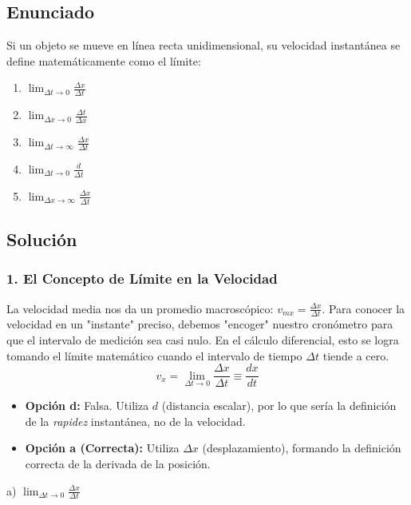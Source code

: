 \documentclass[12pt, a4paper]{article}
\begin{document}
\newpage

\subsection*{Enunciado}
Si un objeto se mueve en línea recta unidimensional, su velocidad instantánea se define matemáticamente como el límite:
\begin{enumerate}[label=\alph*)]
    \item $\lim_{\Delta t \to 0} \frac{\Delta x}{\Delta t}$
    \item $\lim_{\Delta x \to 0} \frac{\Delta t}{\Delta x}$
    \item $\lim_{\Delta t \to \infty} \frac{\Delta x}{\Delta t}$
    \item $\lim_{\Delta t \to 0} \frac{d}{\Delta t}$
    \item $\lim_{\Delta x \to \infty} \frac{\Delta x}{\Delta t}$
\end{enumerate}

\subsection*{Solución}

\subsubsection*{1. El Concepto de Límite en la Velocidad}
La velocidad media nos da un promedio macroscópico: $v_{mx} = \frac{\Delta x}{\Delta t}$. 
Para conocer la velocidad en un "instante" preciso, debemos "encoger" nuestro cronómetro para que el intervalo de medición sea casi nulo. 
En el cálculo diferencial, esto se logra tomando el límite matemático cuando el intervalo de tiempo $\Delta t$ tiende a cero. 
$$ v_x = \lim_{\Delta t \to 0} \frac{\Delta x}{\Delta t} \equiv \frac{dx}{dt} $$
\begin{itemize}
    \item \textbf{Opción d:} Falsa. Utiliza $d$ (distancia escalar), por lo que sería la definición de la \textit{rapidez} instantánea, no de la velocidad.
    \item \textbf{Opción a (Correcta):} Utiliza $\Delta x$ (desplazamiento), formando la definición correcta de la derivada de la posición.
\end{itemize}

\begin{tcolorbox}[colback=green!5!white, colframe=green!50!black, title=Respuesta Final]
\centering \Large a) $\lim_{\Delta t \to 0} \frac{\Delta x}{\Delta t}$
\end{tcolorbox}
\end{document}
